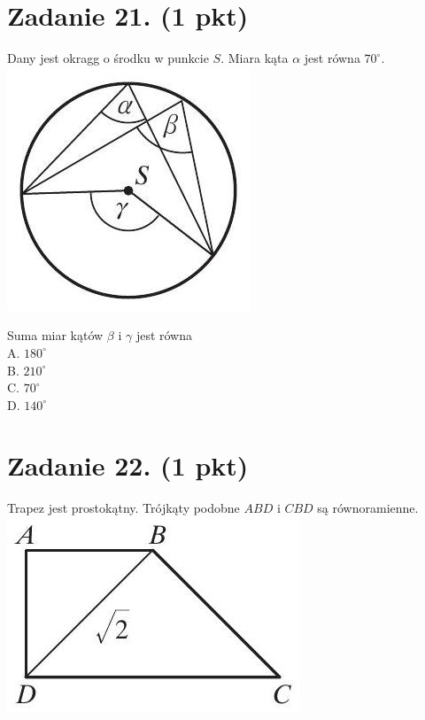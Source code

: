 \documentclass[10pt]{article}
\begin{document}
\section*{Zadanie 21. (1 pkt)}
Dany jest okragg o środku w punkcie \(S\). Miara kąta \(\alpha\) jest równa \(70^{\circ}\).\\
\includegraphics[max width=\textwidth, center]{2024_11_21_3a102e13f4b06a61f46fg-08(1)}

Suma miar kątów \(\beta\) i \(\gamma\) jest równa\\
A. \(180^{\circ}\)\\
B. \(210^{\circ}\)\\
C. \(70^{\circ}\)\\
D. \(140^{\circ}\)

\section*{Zadanie 22. (1 pkt)}
Trapez jest prostokątny. Trójkąty podobne \(A B D\) i \(C B D\) są równoramienne.\\
\includegraphics[max width=\textwidth, center]{2024_11_21_3a102e13f4b06a61f46fg-08}
\end{document}
